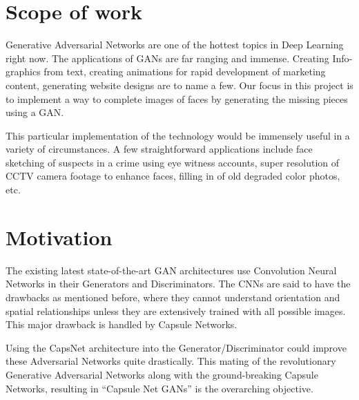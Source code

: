 \section{Scope of work} %
\label{sec:scope_of_work}
Generative Adversarial Networks are one of the hottest topics in Deep Learning right now. The applications of GANs are far ranging and immense. Creating Info-graphics from text, creating animations for rapid development of marketing content, generating website designs are to name a few. Our focus in this project is to implement a way to complete images of faces by generating the missing pieces using a GAN. 

\par\bigskip
This particular implementation of the technology would be immensely useful in a variety of circumstances. A few straightforward applications include face sketching of suspects in a crime using eye witness accounts, super resolution of CCTV camera footage to enhance faces, filling in of old degraded color photos, etc.

\section{Motivation} %
\label{sec:motivation}
The existing latest state-of-the-art GAN architectures use Convolution Neural Networks in their Generators and Discriminators. The CNNs are said to have the drawbacks as mentioned before, where they cannot understand orientation and spatial relationships unless they are extensively trained with all possible images. This major drawback is handled by Capsule Networks.\par\bigskip
Using the CapsNet architecture into the Generator/Discriminator could improve these Adversarial Networks quite drastically. This mating of the revolutionary Generative Adversarial Networks along with the ground-breaking Capsule Networks, resulting in “Capsule Net GANs” is the overarching objective.
